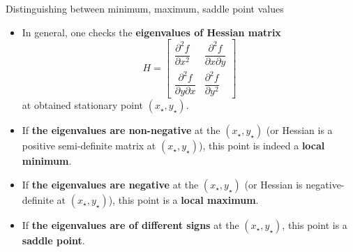 %
%
\begin{frame}{Distinguishing between minimum, maximum, saddle point values}
\begin{itemize}
\item In general, one checks 
the \alert{\bf eigenvalues of Hessian matrix} 
\[
H=\begin{bmatrix}\dfrac{\partial^{2}f}{\partial x^{2}} & \dfrac{\partial^{2}f}{\partial x\partial y}\\
\dfrac{\partial^{2}f}{\partial y\partial x} & \dfrac{\partial^{2}f}{\partial y^{2}}
\end{bmatrix}
\]
at obtained stationary point $(x_\star, y_\star)$.
%
\item If {\bf the eigenvalues are non-negative} at the $(x_\star, y_\star)$ (or Hessian is a positive semi-definite matrix at $(x_\star, y_\star)$), this point is indeed a {\bf local minimum}.
%
\item If {\bf the eigenvalues are negative} at the $(x_\star, y_\star)$ (or Hessian is negative-definite at $(x_\star, y_\star)$), this  point is a {\bf local maximum}.
%
\item If {\bf the eigenvalues are of different signs} at the $(x_\star, y_\star)$, this point is a {\bf saddle point}.
\end{itemize}
\end{frame}
%
%
